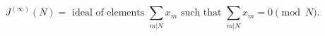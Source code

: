 $$J^{(\infty)}(N) = \text{ ideal of elements } \sum_{m|N} x_m \text{ such that } \sum_{m|N} x_m = 0 \pmod{N}.$$
